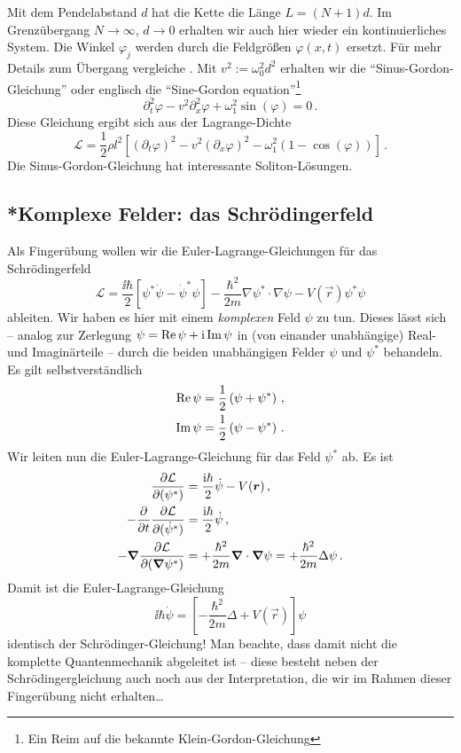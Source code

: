 \documentclass[paper=a4, fontsize=11.0pt, abstractoff, DIV12]{scrartcl}
\newcommand{\LD}{\ensuremath{\mathcal{L}}}
\begin{document}
Mit dem Pendelabstand $d$ hat die Kette die Länge $L=(N+1)d$. Im
Grenzübergang $N\to\infty$, $d\to 0$ erhalten wir auch hier wieder ein
kontinuierliches System. Die Winkel $\varphi_j$ werden durch die Feldgrößen
$\varphi(x,t)$ ersetzt. Für mehr Details zum Übergang vergleiche \cite
{Scheck}. Mit $v^2:=\omega_0^2 d^2$ erhalten wir die
``Sinus-Gordon-Gleichung'' oder englisch die ``Sine-Gordon
equation''\footnote{Ein Reim auf die bekannte Klein-Gordon-Gleichung}
\begin{equation}
\partial_t^2\varphi - v^2\partial_x^2\varphi + \omega_1^2\sin(\varphi) = 0\,.
\end{equation}
Diese Gleichung ergibt sich aus der Lagrange-Dichte
\begin{equation}
\LD = \frac{1}{2}\rho l^2\left[ (\partial_t \varphi)^2 - v^2 (\partial_x \varphi)^2 - \omega_1^2(1-\cos(\varphi))\right]\,.
\end{equation}
Die Sinus-Gordon-Gleichung hat interessante Soliton-Lösungen.

\subsection{*Komplexe Felder: das Schrödingerfeld}

Als Fingerübung wollen wir die Euler-Lagrange-Gleichungen für das
Schrödingerfeld
\begin{equation}
\LD =\frac{\ii\hbar}{2}\left[\psi^*\dot\psi - \dot{\psi}^*\psi \right] - \frac{\hbar^2}{2m}\nabla\psi^*\cdot\nabla\psi - V(\vec r)\psi^*\psi
\end{equation}
ableiten. Wir haben es hier mit einem \emph{komplexen} Feld $\psi$ zu tun.
Dieses lässt sich -- analog zur Zerlegung $\psi = \operatorname{Re}\psi + \mathrm{i}\operatorname{Im}\psi$
in (von einander unabhängige) Real- und Imaginärteile -- durch die beiden
unabhängigen Felder $\psi$ und $\psi^*$ behandeln. Es gilt selbstverständlich
\begin{align*}
\operatorname{Re}\psi &= \frac{1}{2}\left(\psi + \psi^*\right)\,,\\
\operatorname{Im}\psi &= \frac{1}{2}\left(\psi - \psi^*\right)\,.
\end{align*}
Wir leiten nun die Euler-Lagrange-Gleichung für das Feld
$\psi^*$ ab. Es ist
\begin{align*}
\firstpderiv{\LD}{(\psi^*)} &= \frac{\ii\hbar}{2}\dot\psi-V(\vec r)\,,\\
-\firstpderiv{}{t}\firstpderiv{\LD}{(\dot\psi^*)} &= \frac{\ii\hbar}{2}\dot\psi\,,\\
-\nabla\firstpderiv{\LD}{(\nabla\psi^*)} &= +\frac{\hbar^2}{2m}\nabla\cdot\nabla\psi = +\frac{\hbar^2}{2m}\Delta\psi\,.
\end{align*}
Damit ist die Euler-Lagrange-Gleichung
\begin{equation}
\ii\hbar \dot\psi =\left[ -\frac{\hbar^2}{2m}\Delta + V(\vec r)\right]\psi
\end{equation}
identisch der Schrödinger-Gleichung! Man beachte, dass damit nicht die
komplette Quantenmechanik abgeleitet ist -- diese besteht neben der
Schrödingergleichung auch noch aus der Interpretation, die wir im Rahmen
dieser Fingerübung nicht erhalten\dots




\end{document}
